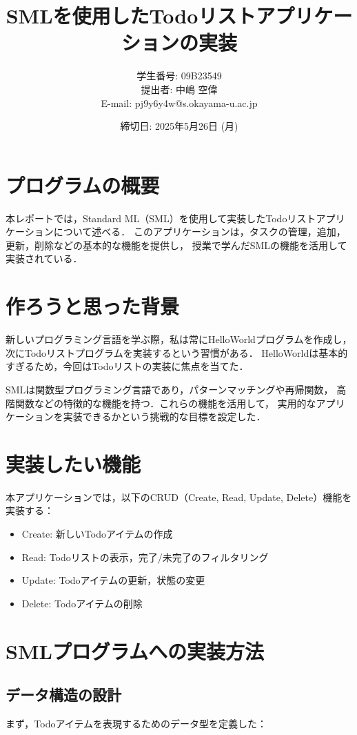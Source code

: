 \documentclass[autodetect-engine,
dvi=dvipdfmx,ja=standard,
               a4j,11pt]{bxjsarticle}
\title{SMLを使用したTodoリストアプリケーションの実装}
\author{学生番号: 09B23549\\
        提出者:  中嶋 空偉\\
        E-mail: pj9y6y4w@s.okayama-u.ac.jp}
\date{
      締切日: 2025年5月26日 (月)}
\begin{document}
\maketitle

\section{プログラムの概要}
本レポートでは，Standard ML（SML）を使用して実装したTodoリストアプリケーションについて述べる．
このアプリケーションは，タスクの管理，追加，更新，削除などの基本的な機能を提供し，
授業で学んだSMLの機能を活用して実装されている．

\section{作ろうと思った背景}
新しいプログラミング言語を学ぶ際，私は常にHelloWorldプログラムを作成し，
次にTodoリストプログラムを実装するという習慣がある．
HelloWorldは基本的すぎるため，今回はTodoリストの実装に焦点を当てた．

SMLは関数型プログラミング言語であり，パターンマッチングや再帰関数，
高階関数などの特徴的な機能を持つ．これらの機能を活用して，
実用的なアプリケーションを実装できるかという挑戦的な目標を設定した．

\section{実装したい機能}
本アプリケーションでは，以下のCRUD（Create, Read, Update, Delete）機能を実装する：

\begin{itemize}
    \item Create: 新しいTodoアイテムの作成
    \item Read: Todoリストの表示，完了/未完了のフィルタリング
    \item Update: Todoアイテムの更新，状態の変更
    \item Delete: Todoアイテムの削除
\end{itemize}

\section{SMLプログラムへの実装方法}
\subsection{データ構造の設計}
まず，Todoアイテムを表現するためのデータ型を定義した：
\end{document}
